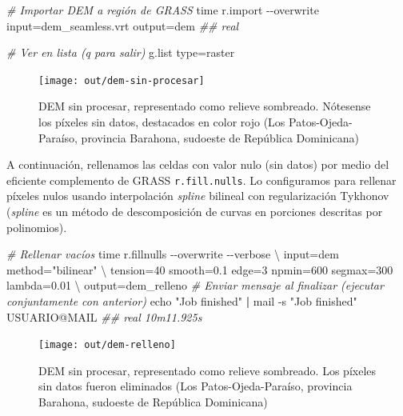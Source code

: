\documentclass[spanish]{article}
\newenvironment{Shaded}{\begin{snugshade}}{\end{snugshade}}
\newcommand{\AttributeTok}[1]{\textcolor[rgb]{0.77,0.63,0.00}{#1}}
\newcommand{\BuiltInTok}[1]{#1}
\newcommand{\CommentTok}[1]{\textcolor[rgb]{0.56,0.35,0.01}{\textit{#1}}}
\newcommand{\DataTypeTok}[1]{\textcolor[rgb]{0.13,0.29,0.53}{#1}}
\newcommand{\ExtensionTok}[1]{#1}
\newcommand{\KeywordTok}[1]{\textcolor[rgb]{0.13,0.29,0.53}{\textbf{#1}}}
\newcommand{\NormalTok}[1]{#1}
\newcommand{\StringTok}[1]{\textcolor[rgb]{0.31,0.60,0.02}{#1}}
\begin{document}
\begin{Shaded}
\begin{Highlighting}[]
\CommentTok{\# Importar DEM a región de GRASS}
\BuiltInTok{time}\NormalTok{ r.import }\AttributeTok{{-}{-}overwrite}\NormalTok{ input=dem\_seamless.vrt output=dem}
\CommentTok{\#\# real }

\CommentTok{\# Ver en lista (q para salir)}
\ExtensionTok{g.list}\NormalTok{ type=raster}
\end{Highlighting}
\end{Shaded}

\begin{figure}

{\centering \texttt{[image: out/dem-sin-procesar]} 

}

\caption{DEM sin procesar, representado como relieve sombreado. Nótesense los píxeles sin datos, destacados en color rojo (Los Patos-Ojeda-Paraíso, provincia Barahona, sudoeste de República Dominicana)}\label{fig:demsinprocesar}
\end{figure}

A continuación, rellenamos las celdas con valor nulo (sin datos) por
medio del eficiente complemento de GRASS \texttt{r.fill.nulls}. Lo
configuramos para rellenar píxeles nulos usando interpolación
\emph{spline} bilineal con regularización Tykhonov (\emph{spline} es un
método de descomposición de curvas en porciones descritas por
polinomios).

\begin{Shaded}
\begin{Highlighting}[]
\CommentTok{\# Rellenar vacíos}
\BuiltInTok{time}\NormalTok{ r.fillnulls }\AttributeTok{{-}{-}overwrite} \AttributeTok{{-}{-}verbose} \DataTypeTok{\textbackslash{}}
\NormalTok{  input=dem method=}\StringTok{"bilinear"} \DataTypeTok{\textbackslash{}}
\NormalTok{  tension=40 smooth=0.1 edge=3 npmin=600 segmax=300 lambda=0.01 }\DataTypeTok{\textbackslash{}}
\NormalTok{  output=dem\_relleno}
\CommentTok{\# Enviar mensaje al finalizar (ejecutar conjuntamente con anterior)}
\BuiltInTok{echo} \StringTok{"Job finished"} \KeywordTok{|} \ExtensionTok{mail} \AttributeTok{{-}s} \StringTok{"Job finished"}\NormalTok{ USUARIO@MAIL}
\CommentTok{\#\# real 10m11.925s}
\end{Highlighting}
\end{Shaded}

\begin{figure}

{\centering \texttt{[image: out/dem-relleno]} 

}

\caption{DEM sin procesar, representado como relieve sombreado. Los píxeles sin datos fueron eliminados (Los Patos-Ojeda-Paraíso, provincia Barahona, sudoeste de República Dominicana)}\label{fig:demrelleno}
\end{figure}
\end{document}
